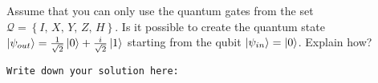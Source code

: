 {{{\vspace{0.1cm}
\begin{question}
Assume that you can only use the quantum gates from the set $\mathcal{Q} = \left\lbrace I,\,X,\,Y,\,Z,\,H\right\rbrace$. Is it possible to create the quantum state $\ket{\psi_{out}} = \frac{1}{\sqrt{2}} \ket{0} + \frac{i}{\sqrt{2}} \ket{1}$ starting from the qubit $\ket{\psi_{in}} = \ket{0}$. Explain how?
\label{qst:assignment1_4}
\end{question}
{\small
\texttt{Write down your solution here:}
\begin{equation*}
  \begin{split}
  \end{split}
\end{equation*}}
\vspace{0.1cm}

}}}
